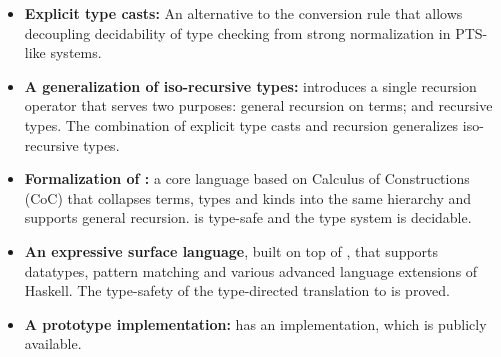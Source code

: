 \begin{itemize}
\item {\bf Explicit type casts:} An alternative to the conversion rule
  that allows decoupling decidability of type checking from strong
  normalization in PTS-like systems.

\item {\bf A generalization of iso-recursive types:} \name introduces 
  a single recursion operator that serves two purposes:
  general recursion on terms; and recursive types. The combination of
  explicit type casts and recursion generalizes iso-recursive types.

\item {\bf Formalization of \name:} a core
  language based on Calculus of Constructions (CoC) that collapses
  terms, types and kinds into the same hierarchy and supports general
  recursion. \name is type-safe and the type system is decidable.

\item {\bf An expressive surface language}, built on top of \name,
  that supports datatypes, pattern matching and various advanced
  language extensions of Haskell. The type-safety of the type-directed
  translation to \name is proved.

\item {\bf A prototype implementation:} \name has an
  implementation, which is publicly available.
\end{itemize}

